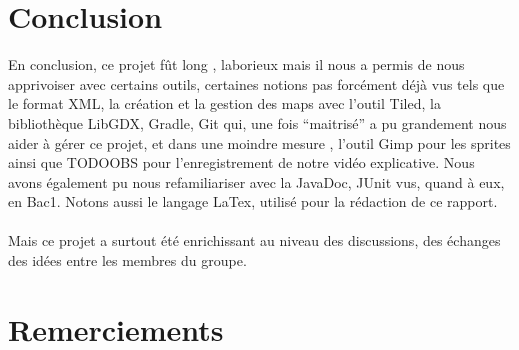\documentclass[a4paper,10pt]{article}
\begin{document}
\section{Conclusion}
En conclusion, ce projet fût long , laborieux mais il nous a permis de nous apprivoiser avec certains outils, certaines notions
pas forcément déjà vus tels que le format XML, la création et la gestion des maps avec l'outil Tiled, la bibliothèque LibGDX, Gradle, 
Git qui, une fois ``maitrisé'' a pu grandement nous aider à gérer ce projet, et dans une moindre
mesure , l'outil Gimp pour les sprites ainsi que TODOOBS pour l'enregistrement de notre vidéo explicative. 
Nous avons également pu nous refamiliariser avec la JavaDoc, JUnit vus, quand à eux, en Bac1. Notons aussi le langage LaTex, utilisé pour 
la rédaction de ce rapport.
\\
\\
Mais ce projet a surtout été enrichissant au niveau des discussions, des échanges des idées entre les membres du groupe.

\section{Remerciements}
\end{document}
